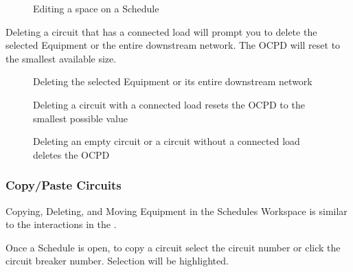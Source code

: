 \documentclass[letterpaper,10pt,english]{sphinxmanual}
\begin{document}
\begin{figure}[H]
\centering
\capstart

\noindent{}
\caption{Editing a space on a Schedule}\label{\detokenize{docs/userguide/buildingelectricalmodel/schedules/index-schedules:id3}}\end{figure}

Deleting a circuit that has a connected load will prompt you to delete the selected Equipment or the entire downstream network.  The OCPD will reset to the smallest available size.

\begin{figure}[H]
\centering
\capstart

\noindent{}
\caption{Deleting the selected Equipment or its entire downstream network}\label{\detokenize{docs/userguide/buildingelectricalmodel/schedules/index-schedules:id4}}\end{figure}

\begin{figure}[H]
\centering
\capstart

\noindent{}
\caption{Deleting a circuit with a connected load resets the OCPD to the smallest possible value}\label{\detokenize{docs/userguide/buildingelectricalmodel/schedules/index-schedules:id5}}\end{figure}

\begin{figure}[H]
\centering
\capstart

\noindent{}
\caption{Deleting an empty circuit or a circuit without a connected load deletes the OCPD}\label{\detokenize{docs/userguide/buildingelectricalmodel/schedules/index-schedules:id6}}\end{figure}


\subsubsection{Copy/Paste Circuits}
\label{\detokenize{docs/userguide/buildingelectricalmodel/schedules/index-schedules:copy-paste-circuits}}
Copying, Deleting, and Moving Equipment in the Schedules Workspace is similar to the interactions in the {\hyperref[\detokenize{docs/userguide/buildingelectricalmodel/one-line/index-one-line:one-line}]{}}.

Once a Schedule is open, to copy a circuit select the circuit number or click the circuit breaker number.  Selection will be highlighted.
\end{document}
